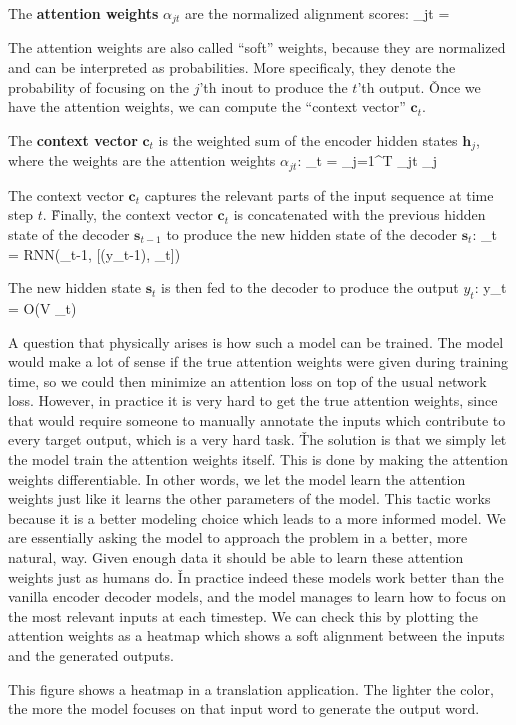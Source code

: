 The \textbf{attention weights} $\alpha_{jt}$ are the normalized alignment scores:
\bse
\alpha_{jt} = 
\ese
\ed

The attention weights are also called ``soft'' weights, because they are normalized and can be interpreted as
probabilities. More specificaly, they denote the probability of focusing on the $j$'th inout to produce the $t$'th
output. \v

Once we have the attention weights, we can compute the ``context vector'' $\boldsymbol{c}_t$.

The \textbf{context vector} $\boldsymbol{c}_t$ is the weighted sum of the encoder hidden states $\boldsymbol{h}_j$,
where the weights are the attention weights $\alpha_{jt}$:
\bse
{}_t = \sum_{j=1}^{T} \alpha_{jt} _j
\ese
\ed

The context vector $\boldsymbol{c}_t$ captures the relevant parts of the input sequence at time step $t$. \v

Finally, the context vector $\boldsymbol{c}_t$ is concatenated with the previous hidden state of the decoder
$\boldsymbol{s}_{t-1}$ to produce the new hidden state of the decoder $\boldsymbol{s}_t$:
\bse
{}_{t} = RNN(_{t-1}, [(y_{t-1}), _t])
\ese

The new hidden state $\boldsymbol{s}_t$ is then fed to the decoder to produce the output $y_t$:
\bse
y_t = O(V _t)
\ese

\vspace{-10pt}

A question that physically arises is how such a model can be trained. The model would make a lot of sense if the true
attention weights were given during training time, so we could then minimize an attention loss on top of the usual
network loss. However, in practice it is very hard to get the true attention weights, since that would require someone
to manually annotate the inputs which contribute to every target output, which is a very hard task. \v

The solution is that we simply let the model train the attention weights itself. This is done by making the attention
weights differentiable. In other words, we let the model learn the attention weights just like it learns the other
parameters of the model. This tactic works because it is a better modeling choice which leads to a more informed
model. We are essentially asking the model to approach the problem in a better, more natural, way. Given enough data
it should be able to learn these attention weights just as humans do. \v

In practice indeed these models work better than the vanilla encoder decoder models, and the model manages to learn
how to focus on the most relevant inputs at each timestep. We can check this by plotting the attention weights as a
heatmap which shows a soft alignment between the inputs and the generated outputs.

\be
This figure shows a heatmap in a translation application. The lighter the color, the more the model focuses on that
input word to generate the output word.
\ee